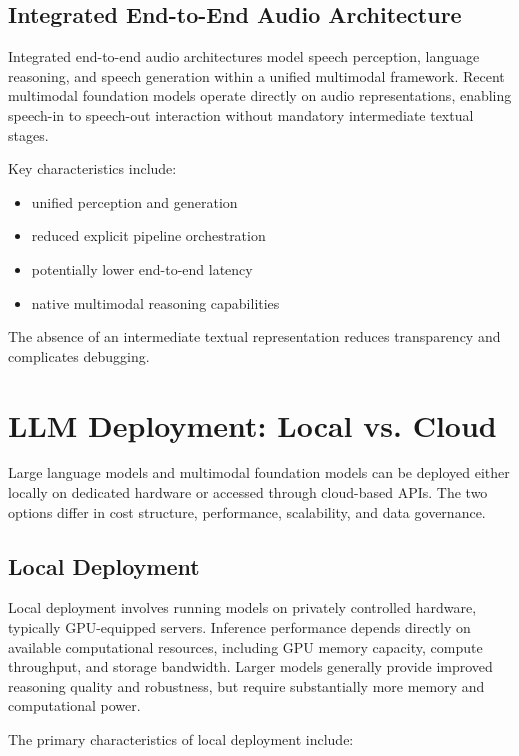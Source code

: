 \subsection{Integrated End-to-End Audio Architecture}

Integrated end-to-end audio architectures model speech perception, language reasoning, and speech generation within a unified multimodal framework.
Recent multimodal foundation models operate directly on audio representations, enabling speech-in to speech-out interaction without mandatory intermediate textual stages.

Key characteristics include:

\begin{itemize}
    \item unified perception and generation
    \item reduced explicit pipeline orchestration
    \item potentially lower end-to-end latency
    \item native multimodal reasoning capabilities
\end{itemize}

The absence of an intermediate textual representation reduces transparency and complicates debugging.


\section{LLM Deployment: Local vs. Cloud}
\label{sec:local_vs_cloud}

Large language models and multimodal foundation models can be deployed either locally on dedicated hardware or accessed through cloud-based APIs.
The two options differ in cost structure, performance, scalability, and data governance.

\subsection{Local Deployment}

Local deployment involves running models on privately controlled hardware, typically GPU-equipped servers.
Inference performance depends directly on available computational resources, including GPU memory capacity, compute throughput, and storage bandwidth.
Larger models generally provide improved reasoning quality and robustness, but require substantially more memory and computational power.

The primary characteristics of local deployment include:

